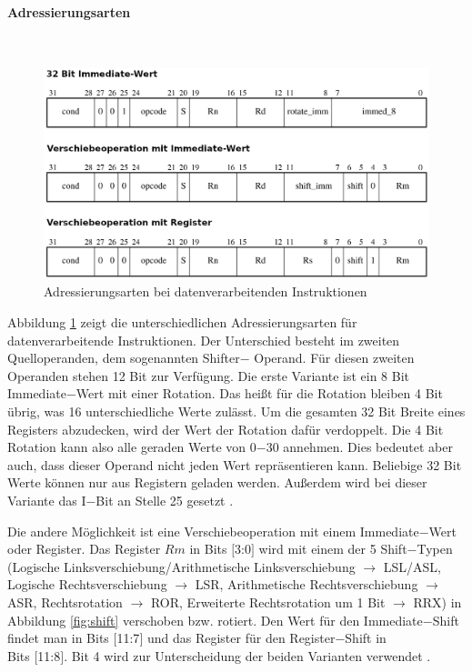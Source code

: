 \documentclass[a4paper, 11pt, onecolumn]{article}
\begin{document}
\paragraph{Adressierungsarten}\label{sec:dataInstAddr}
~\\
\begin{figure}[!htb]
\centering
\includegraphics[width=1\textwidth]{data/dataInstAddr}
\caption[Adressierungsarten Shifter$-$Operand]{Adressierungsarten bei datenverarbeitenden Instruktionen \cite{arm:2005}}
\label{fig:dataInstAddr}
\end{figure}

Abbildung \ref{fig:dataInstAddr} zeigt die unterschiedlichen Adressierungsarten für datenverarbeitende Instruktionen. Der Unterschied besteht im zweiten Quelloperanden, dem sogenannten Shifter$-$
Operand. Für diesen zweiten Operanden stehen 12 Bit zur Verfügung. Die erste Variante ist ein 8 Bit Immediate$-$Wert mit einer Rotation. Das heißt für die Rotation bleiben 4 Bit übrig, was 16 unterschiedliche Werte zulässt. Um die gesamten 32 Bit Breite eines Registers abzudecken, wird der Wert der Rotation dafür verdoppelt. Die 4 Bit Rotation kann also alle geraden Werte von 0$-$30 annehmen. Dies bedeutet aber auch, dass dieser Operand nicht jeden Wert repräsentieren kann. Beliebige 32 Bit Werte können nur aus Registern geladen werden. Außerdem wird bei dieser Variante das I$-$Bit an Stelle 25 gesetzt \cite{arm:2005}.

Die andere Möglichkeit ist eine Verschiebeoperation mit einem Immediate$-$Wert oder Register. Das Register $Rm$ in Bits $[$3:0$]$ wird mit einem der 5 Shift$-$Typen (Logische Linksverschiebung/Arithmetische Linksverschiebung $\rightarrow$ LSL/ASL, Logische Rechtsverschiebung $\rightarrow$ LSR, Arithmetische Rechtsverschiebung $\rightarrow$ ASR, Rechtsrotation $\rightarrow$ ROR, Erweiterte Rechtsrotation um 1 Bit $\rightarrow$ RRX) in Abbildung \ref{fig:shift} verschoben bzw. rotiert. Den Wert für den Immediate$-$Shift findet man in Bits $[$11:7$]$ und das Register für den Register$-$Shift in\\Bits $[$11:8$]$. Bit 4 wird zur Unterscheidung der beiden Varianten verwendet \cite{arm:2005}.
\end{document}
